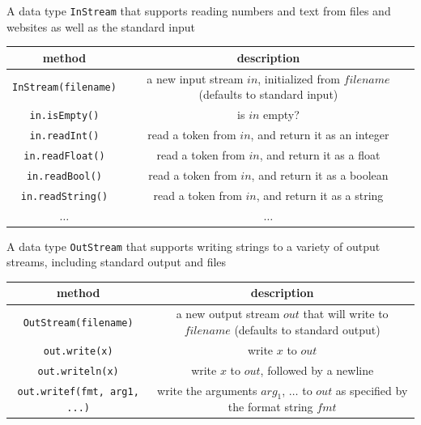 \documentclass[8pt,a4paper,compress,handout]{beamer}
\begin{document}
\begin{frame}[fragile]
A data type \lstinline{InStream} that supports reading numbers and text from files and websites as well as the standard input
\begin{center}
\begin{tabular}{cc}
method & description \\ \hline
\lstinline$InStream(filename)$ & \makecell{a new input stream $in$, initialized \\ from $filename$ (defaults to standard input)} \\
\lstinline$in.isEmpty()$ & is $in$ empty? \\
\lstinline$in.readInt()$ & read a token from $in$, and return it as an integer \\
\lstinline$in.readFloat()$ & read a token from $in$, and return it as a float \\
\lstinline$in.readBool()$ & read a token from $in$, and return it as a boolean \\
\lstinline$in.readString()$ & read a token from $in$, and return it as a string \\
$\dots$ & $\dots$
\end{tabular} 
\end{center}

\bigskip

A data type \lstinline{OutStream} that supports writing strings to a variety of output streams, including standard output and files
\begin{center}
\begin{tabular}{cc}
method & description \\ \hline
\lstinline$OutStream(filename)$ & \makecell{a new output stream $out$ that will write \\ to $filename$ (defaults to standard output)} \\
\lstinline$out.write(x)$ & write $x$ to $out$ \\
\lstinline$out.writeln(x)$ & write $x$ to $out$, followed by a newline \\
\lstinline$out.writef(fmt, arg1, ...)$ & \makecell{write the arguments $arg_1$, $\dots$ to $out$ as \\ specified by the format string $fmt$}
\end{tabular} 
\end{center}
\end{frame}
\end{document}
